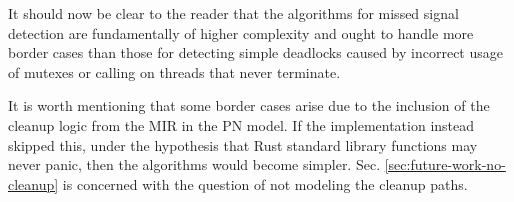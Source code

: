 It should now be clear to the reader that the algorithms for missed signal detection are
fundamentally of higher complexity and ought to handle more border cases than
those for detecting simple deadlocks caused by incorrect usage of mutexes or
calling  on threads that never terminate.

It is worth mentioning that some border cases arise
due to the inclusion of the cleanup logic
from the \acrshort{MIR} in the \acrshort{PN} model.
If the implementation instead skipped this,
under the hypothesis that Rust standard library functions may never panic,
then the algorithms would become simpler.
Sec. \ref{sec:future-work-no-cleanup} is concerned with
the question of not modeling the cleanup paths.